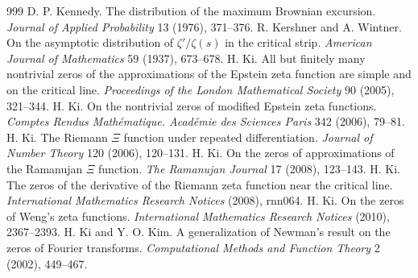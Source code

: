 \begin{thebibliography}{999}
 D. P. Kennedy. The distribution of the maximum Brownian excursion. \emph{Journal of Applied Probability} 13 (1976), 371--376.
 R. Kershner and A. Wintner. On the asymptotic distribution of $\zeta'/\zeta(s)$ in the critical strip. \emph{American Journal of Mathematics} 59 (1937), 673--678.
 H. Ki. All but finitely many nontrivial zeros of the approximations of the Epstein zeta function are simple and on the critical line. \emph{Proceedings of the London Mathematical Society} 90 (2005), 321--344.
 H. Ki. On the nontrivial zeros of modified Epstein zeta functions. \emph{Comptes Rendus Math\'ematique. Acad\'emie des Sciences Paris} 342 (2006), 79--81.
 H. Ki. The Riemann $\Xi$ function under repeated differentiation. \emph{Journal of Number Theory} 120 (2006), 120--131.
 H. Ki. On the zeros of approximations of the Ramanujan $\Xi$ function. \emph{The Ramanujan Journal} 17 (2008), 123--143.
 H. Ki. The zeros of the derivative of the Riemann zeta function near the critical line. \emph{International Mathematics Research Notices} (2008), rnn064.
 H. Ki. On the zeros of Weng's zeta functions. \emph{International Mathematics Research Notices} (2010), 2367--2393.
 H. Ki and Y. O. Kim. A generalization of Newman's result on the zeros of Fourier transforms. \emph{Computational Methods and Function Theory} 2 (2002), 449--467.

\end{thebibliography}

